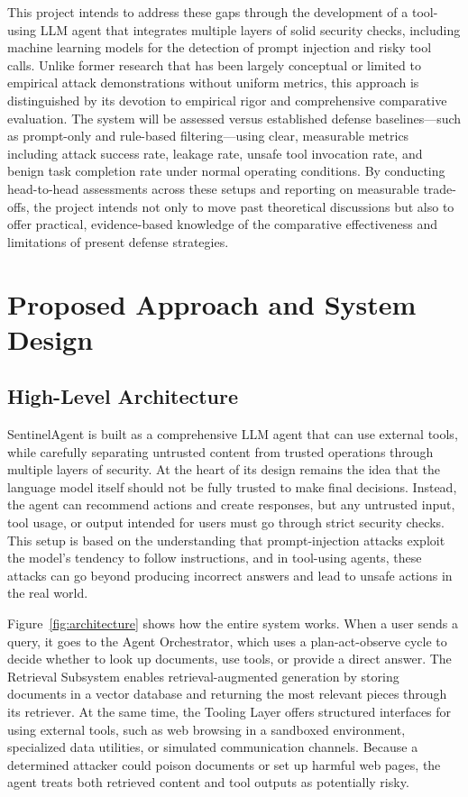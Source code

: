 \documentclass[11pt]{article}
\begin{document}
This project intends to address these gaps through the development of a tool-using LLM agent that integrates multiple layers of solid security checks, including machine learning models for the detection of prompt injection and risky tool calls. Unlike former research that has been largely conceptual or limited to empirical attack demonstrations without uniform metrics, this approach is distinguished by its devotion to empirical rigor and comprehensive comparative evaluation. The system will be assessed versus established defense baselines---such as prompt-only and rule-based filtering---using clear, measurable metrics including attack success rate, leakage rate, unsafe tool invocation rate, and benign task completion rate under normal operating conditions. By conducting head-to-head assessments across these setups and reporting on measurable trade-offs, the project intends not only to move past theoretical discussions but also to offer practical, evidence-based knowledge of the comparative effectiveness and limitations of present defense strategies.

\section{Proposed Approach and System Design}

\subsection{High-Level Architecture}
SentinelAgent is built as a comprehensive LLM agent that can use external tools, while carefully separating untrusted content from trusted operations through multiple layers of security. At the heart of its design remains the idea that the language model itself should not be fully trusted to make final decisions. Instead, the agent can recommend actions and create responses, but any untrusted input, tool usage, or output intended for users must go through strict security checks. This setup is based on the understanding that prompt-injection attacks exploit the model's tendency to follow instructions, and in tool-using agents, these attacks can go beyond producing incorrect answers and lead to unsafe actions in the real world.

Figure~\ref{fig:architecture} shows how the entire system works. When a user sends a query, it goes to the Agent Orchestrator, which uses a plan-act-observe cycle to decide whether to look up documents, use tools, or provide a direct answer. The Retrieval Subsystem enables retrieval-augmented generation by storing documents in a vector database and returning the most relevant pieces through its retriever. At the same time, the Tooling Layer offers structured interfaces for using external tools, such as web browsing in a sandboxed environment, specialized data utilities, or simulated communication channels. Because a determined attacker could poison documents or set up harmful web pages, the agent treats both retrieved content and tool outputs as potentially risky.
\end{document}

